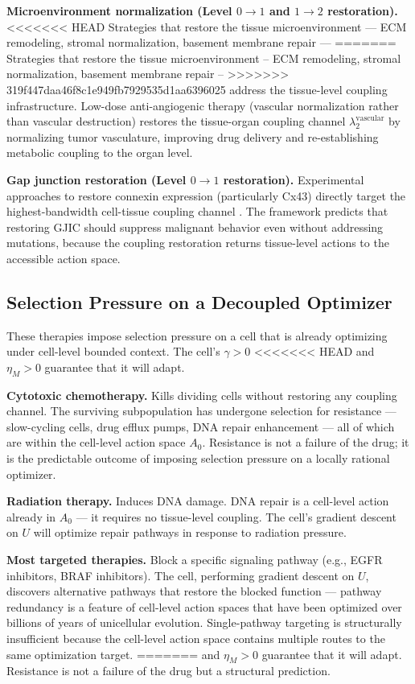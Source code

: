 \documentclass[11pt]{article}
\theoremstyle{definition}
\theoremstyle{remark}
\begin{document}
\textbf{Microenvironment normalization (Level $0 \to 1$ and $1 \to 2$
restoration).}
<<<<<<< HEAD
Strategies that restore the tissue microenvironment --- ECM
remodeling, stromal normalization, basement membrane repair ---
=======
Strategies that restore the tissue microenvironment -- ECM
remodeling, stromal normalization, basement membrane repair --
>>>>>>> 319f447daa46f8c1e949fb7929535d1aa6396025
address the tissue-level coupling infrastructure. Low-dose
anti-angiogenic therapy (vascular normalization rather than vascular
destruction) restores the tissue-organ coupling channel
$\lambda_2^{\mathrm{vascular}}$ by normalizing tumor vasculature,
improving drug delivery and re-establishing metabolic coupling to
the organ level.

\textbf{Gap junction restoration (Level $0 \to 1$ restoration).}
Experimental approaches to restore connexin expression (particularly
Cx43) directly target the highest-bandwidth cell-tissue coupling
channel \cite{Aasen2016}. The framework predicts that restoring GJIC
should suppress malignant behavior even without addressing mutations,
because the coupling restoration returns tissue-level actions to the
accessible action space.

\subsection{Selection Pressure on a Decoupled Optimizer}

These therapies impose selection pressure on a cell that is already
optimizing under cell-level bounded context. The cell's $\gamma > 0$
<<<<<<< HEAD
and $\eta_M > 0$ \cite{McCarthy2026e} guarantee that it will adapt.

\textbf{Cytotoxic chemotherapy.} Kills dividing cells without
restoring any coupling channel. The surviving subpopulation has
undergone selection for resistance --- slow-cycling cells, drug
efflux pumps, DNA repair enhancement --- all of which are within the
cell-level action space $A_0$. Resistance is not a failure of the
drug; it is the predictable outcome of imposing selection pressure on
a locally rational optimizer.

\textbf{Radiation therapy.} Induces DNA damage. DNA repair is a
cell-level action already in $A_0$ --- it requires no tissue-level
coupling. The cell's gradient descent on $U$ will optimize repair
pathways in response to radiation pressure.

\textbf{Most targeted therapies.} Block a specific signaling pathway
(e.g., EGFR inhibitors, BRAF inhibitors). The cell, performing
gradient descent on $U$, discovers alternative pathways that restore
the blocked function --- pathway redundancy is a feature of cell-level
action spaces that have been optimized over billions of years of
unicellular evolution. Single-pathway targeting is structurally
insufficient because the cell-level action space contains multiple
routes to the same optimization target.
=======
and $\eta_M > 0$ \cite{McCarthy2026d} guarantee that it will adapt.
Resistance is not a failure of the drug but a structural prediction.
\end{document}
